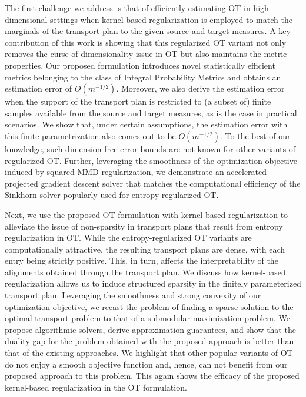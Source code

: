 {The first challenge we address is that of efficiently estimating OT in high dimensional settings when kernel-based regularization is employed to match the marginals of the transport plan to the given source and target measures. A key contribution of this work is showing that this regularized OT variant not only removes the curse of dimensionality issue in OT but also maintains the metric properties. 
Our proposed formulation introduces novel statistically efficient metrics belonging to the class of Integral Probability Metrics and obtains an estimation error of $O(m^{-1/2})$. 
Moreover, we also derive the estimation error when the support of the transport plan is restricted to (a subset of) finite samples available from the source and target measures, as is the case in practical scenarios. We show that, under certain assumptions, the estimation error with this finite parametrization also comes out to be $O(m^{-1/2})$. To the best of our knowledge, such dimension-free error bounds are not known for other variants of regularized OT.
Further, leveraging the smoothness of the optimization objective induced by squared-MMD regularization, we demonstrate an accelerated projected gradient descent solver that matches the computational efficiency of the Sinkhorn solver popularly used for entropy-regularized OT.

Next, we use the proposed OT formulation with kernel-based regularization to alleviate the issue of non-sparsity in transport plans that result from entropy regularization in OT. While the entropy-regularized OT variants are computationally attractive, the resulting transport plans are dense, with each entry being strictly positive.  This, in turn, affects the interpretability of the alignments
obtained through the transport plan. We discuss how kernel-based regularization allows us to induce structured sparsity in the finitely parameterized transport plan.
Leveraging the smoothness and strong convexity of our optimization objective, we recast the problem of finding a sparse solution to the optimal transport problem to that of a submodular maximization problem. We propose algorithmic solvers, derive approximation guarantees, and show that the duality gap for the problem obtained with the proposed approach is better than that of the existing approaches. We highlight that other popular variants of OT do not enjoy a smooth objective function and, hence, can not benefit from our proposed approach to this problem. This again shows the efficacy of the proposed kernel-based regularization in the OT formulation. 

}

